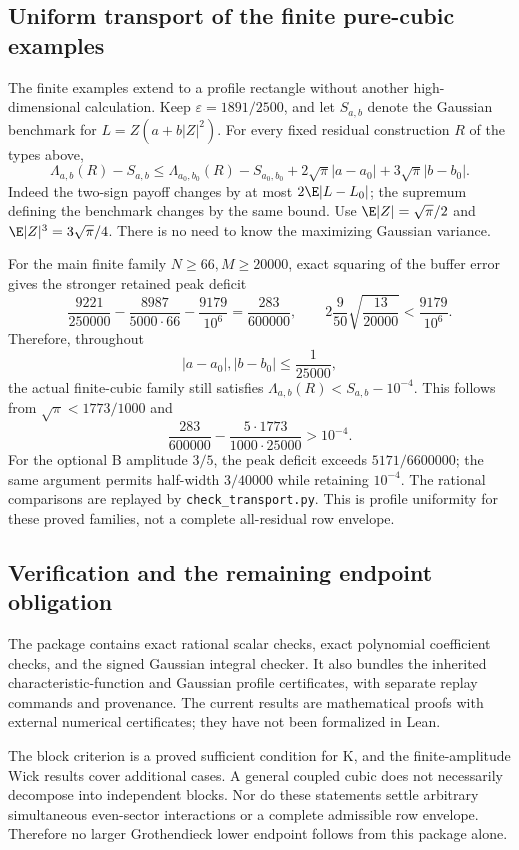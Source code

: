 \subsection{Uniform transport of the finite pure-cubic examples}
The finite examples extend to a profile rectangle without another
high-dimensional calculation. Keep $\varepsilon=1891/2500$, and let
$S_{a,b}$ denote the Gaussian benchmark for $L=Z(a+b|Z|^2)$.
For every fixed residual construction $R$ of the types above,
\[
 \Lambda_{a,b}(R)-S_{a,b}
 \le\Lambda_{a_0,b_0}(R)-S_{a_0,b_0}
     +2\sqrt\pi|a-a_0|+3\sqrt\pi|b-b_0|.
\]
Indeed the two-sign payoff changes by at most $2\E|L-L_0|$;
the supremum defining the benchmark changes by the same bound.
Use $\E|Z|=\sqrt\pi/2$ and $\E|Z|^3=3\sqrt\pi/4$.
There is no need to know the maximizing Gaussian variance.

For the main finite family $N\ge66,M\ge20000$, exact squaring of
the buffer error gives the stronger retained peak deficit
\[
 \frac{9221}{250000}-\frac{8987}{5000\cdot66}
     -\frac{9179}{10^6}=\frac{283}{600000},
 \qquad 2\frac9{50}\sqrt{\frac{13}{20000}}<\frac{9179}{10^6}.
\]
Therefore, throughout
\[
 |a-a_0|,|b-b_0|\le\frac1{25000},
\]
the actual finite-cubic family still satisfies
$\Lambda_{a,b}(R)<S_{a,b}-10^{-4}$.
This follows from $\sqrt\pi<1773/1000$ and
\[
 \frac{283}{600000}-\frac{5\cdot1773}{1000\cdot25000}>10^{-4}.
\]
For the optional B amplitude $3/5$, the peak deficit exceeds
$5171/6600000$; the same argument permits half-width $3/40000$
while retaining $10^{-4}$. The rational comparisons are replayed by
\texttt{check\_transport.py}. This is profile uniformity for these
proved families, not a complete all-residual row envelope.

\subsection{Verification and the remaining endpoint obligation}
The package contains exact rational scalar checks, exact polynomial
coefficient checks, and the signed Gaussian integral checker.
It also bundles the inherited characteristic-function and Gaussian
profile certificates, with separate replay commands and provenance.
The current results are mathematical proofs with external numerical
certificates; they have not been formalized in Lean.

The block criterion is a proved sufficient condition for K, and the
finite-amplitude Wick results cover additional cases. A general
coupled cubic does not necessarily decompose into independent blocks.
Nor do these statements settle arbitrary simultaneous even-sector
interactions or a complete admissible row envelope. Therefore no
larger Grothendieck lower endpoint follows from this package alone.

